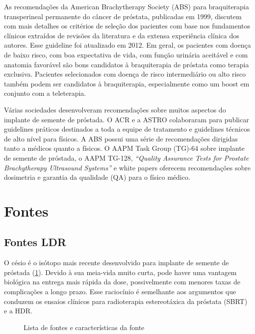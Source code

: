 \documentclass[11pt,a4paper]{article}
\begin{document}
	As recomendações da American Brachytherapy Society (ABS) para braquiterapia transperineal permanente do câncer de próstata, publicadas em 1999, discutem com mais detalhes os critérios de seleção dos pacientes com base nos fundamentos clínicos extraídos de revisões da literatura e da extensa experiência clínica dos autores. Esse guideline foi atualizado em 2012. Em geral, os pacientes com doença de baixo risco, com boa expectativa de vida, com função urinária aceitável e com anatomia favorável são bons candidatos à braquiterapia de próstata como terapia exclusiva. Pacientes selecionados com doença de risco intermediário ou alto risco também podem ser candidatos à braquiterapia, especialmente como um boost em conjunto com a teleterapia.

	Várias sociedades desenvolveram recomendações sobre muitos aspectos do implante de semente de próstada. O ACR e a ASTRO colaboraram para publicar guidelines práticos destinados a toda a equipe de tratamento e guidelines técnicos de alto nível para físicos. A ABS possui uma série de recomendações dirigidas tanto a médicos quanto a físicos. O AAPM Task Group (TG)-64 sobre implante de semente de próstada, o AAPM TG-128, \textit{``Quality Assurance Tests for Prostate Brachytherapy Ultrasound Systems''} e white papers oferecem recomendações sobre dosimetria e garantia da qualidade (QA) para o  físico médico.

\section{Fontes}

\subsection*{Fontes LDR}

	O césio é o isótopo mais recente desenvolvido para implante de semente de próstada (\ref{fig:fontesBraquiProstata}). Devido à sua meia-vida muito curta, pode haver uma vantagem biológica na entrega mais rápida da dose, possivelmente com menores taxas de complicações a longo prazo. Esse raciocínio é semelhante aos argumentos que conduzem os ensaios clínicos para radioterapia estereotáxica da próstata (SBRT) e a HDR.

	\begin{figure}[h]
		\centering
		\caption{Lista de fontes e características da fonte}
		\label{fig:fontesBraquiProstata}
	\end{figure}
\end{document}
